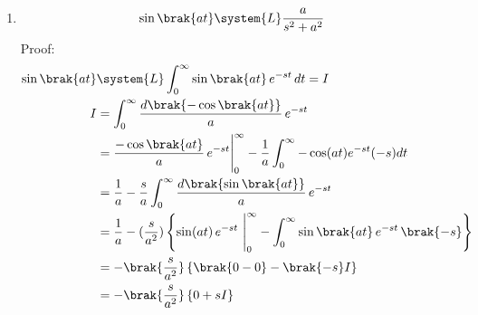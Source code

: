 \begin{enumerate}[label=\thesubsection.\arabic*,ref=\thesubsection.\theenumi]
Proof:
\begin{align}
    \cos(at)&\system{L}\int_{0}^{\infty}\cos\brak{at}\,e^{-st}\,dt=I\\
                          I&=\int_{0}^{\infty}\frac{d\brak{\sin\brak{at}}}{a}\,e^{-st}\\
                           &=\frac{\sin\brak{at}}{a}\,e^{-st}\Bigg|_0^\infty-\frac{1}{a}\int_{0}^{\infty}\sin(at)e^{-st}\brak{-s}dt\\
                           &=0+\frac{s}{a}\int_0^\infty \frac{d\brak{-\cos\brak{at}}}{a}\,e^{-st}\\
                           &=-\brak{\frac{s}{a^2}}\left\{\cos\brak{at}\,e^{-st}\,\,\Bigg|_0^\infty-\int_0^\infty\cos\brak{at}\,e^{-st}\,\brak{-s}\right\}\\
                           &=-\brak{\frac{s}{a^2}}\left\{\brak{0-1}-\brak{-s}I\right\}\\
                           &=-\brak{\frac{s}{a^2}}\left\{-1+sI\right\}\\
                          I&=\frac{s}{a^2}-\frac{s^2}{a^2}\brak{I}\\
       \brak{\frac{a^2+s^2}{a^2}}I&=\frac{s}{a^2}\\
                          I&=\frac{s}{s^2+a^2}
\end{align}
\item
\begin{align}
\sin\brak{at}&\system{L}\frac{a}{s^2+a^2}\label{eq:laplacesin}
\end{align}
Proof:
\begin{align}
    \sin\brak{at}&\system{L}\int_{0}^{\infty}\sin\brak{at}\,e^{-st}\,dt=I\\
                          I&=\int_{0}^{\infty}\frac{d\brak{-\cos\brak{at}}}{a}\,e^{-st}\\
                           &=\frac{-\cos\brak{at}}{a}\,e^{-st}\Bigg|_0^\infty-\frac{1}{a}\int_{0}^{\infty}-\cos(at)e^{-st}(-s)dt\\
                           &=\frac{1}{a}-\frac{s}{a}\int_0^\infty \frac{d\brak{\sin\brak{at}}}{a}\,e^{-st}\\
                           &=\frac{1}{a}-(\frac{s}{a^2})\left\{\sin(at)\,e^{-st}\,\,\Bigg|_0^\infty-\int_0^\infty\sin\brak{at}\,e^{-st}\,\brak{-s}\right\}\\
                           &=-\brak{\frac{s}{a^2}}\left\{\brak{0-0}-\brak{-s}I\right\}\\
                           &=-\brak{\frac{s}{a^2}}\left\{0+sI\right\}\\

\end{align}
\end{enumerate}
